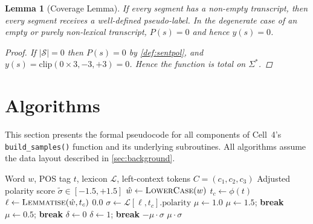 \documentclass[12pt,a4paper]{article}
\theoremstyle{plain}
\newtheorem{lemma}[theorem]{Lemma}
\theoremstyle{definition}
\begin{document}
\begin{lemma}[Coverage Lemma]
\label{lem:coverage}
  If every segment has a non-empty transcript, then every segment
  receives a well-defined pseudo-label.  In the degenerate case of
  an empty or purely non-lexical transcript, $P(s) = 0$ and hence
  $y(s) = 0$.
  \begin{proof}
    If $|\mathcal{S}| = 0$ then $P(s) = 0$ by \cref{def:sentpol},
    and $y(s) = \text{clip}(0 \times 3, -3, +3) = 0$.  Hence the
    function is total on $\Sigma^*$.
  \end{proof}
\end{lemma}

\section{Algorithms}
\label{sec:algorithms}

This section presents the formal pseudocode for all components of
Cell~4's \texttt{build\_samples()} function and its underlying
subroutines.  All algorithms assume the data layout described in
\cref{sec:background}.

\begin{algorithm}[H]
\caption{TextBlob Word Score for a Single Token}
\label{alg:word_score}
\begin{algorithmic}[1]
\Require Word $w$, POS tag $t$, lexicon $\mathcal{L}$,
         left-context tokens $C = (c_1, c_2, c_3)$
\Ensure  Adjusted polarity score $\tilde{\sigma} \in [-1.5, +1.5]$
\State $\hat{w} \gets \textsc{LowerCase}(w)$
\State $t_c \gets \phi(t)$ 
\State $\ell \gets \textsc{Lemmatise}(\hat{w}, t_c)$
  \State \Return $0.0$
\EndIf
\State $\sigma \gets \mathcal{L}[\ell, t_c].\text{polarity}$
\State $\mu \gets 1.0$ 
    \State $\mu \gets 1.5$; \textbf{break}
    \State $\mu \gets 0.5$; \textbf{break}
  \EndIf
\EndFor
\State $\delta \gets 0$
    \State $\delta \gets 1$; \textbf{break}
  \EndIf
\EndFor
{}
  \State \Return $-\mu \cdot \sigma$
\Else
  \State \Return $\mu \cdot \sigma$
\EndIf
\end{algorithmic}
\end{algorithm}
\end{document}
